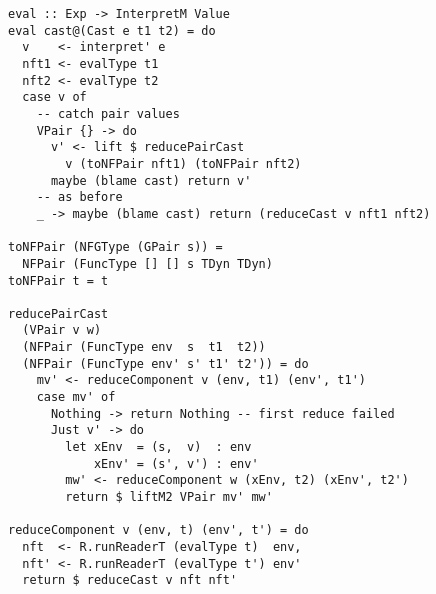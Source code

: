 \begin{lstlisting}[float,
  caption=Rule \textsc{Cast-Pair} (\texttt{Interpreter.hs}),
  label=lst:pair-cast]
eval :: Exp -> InterpretM Value
eval cast@(Cast e t1 t2) = do
  v    <- interpret' e
  nft1 <- evalType t1
  nft2 <- evalType t2
  case v of
    -- catch pair values
    VPair {} -> do
      v' <- lift $ reducePairCast
        v (toNFPair nft1) (toNFPair nft2)
      maybe (blame cast) return v'
    -- as before
    _ -> maybe (blame cast) return (reduceCast v nft1 nft2)

toNFPair (NFGType (GPair s)) =
  NFPair (FuncType [] [] s TDyn TDyn)
toNFPair t = t

reducePairCast
  (VPair v w)
  (NFPair (FuncType env  s  t1  t2))
  (NFPair (FuncType env' s' t1' t2')) = do
    mv' <- reduceComponent v (env, t1) (env', t1')
    case mv' of
      Nothing -> return Nothing -- first reduce failed
      Just v' -> do
        let xEnv  = (s,  v)  : env
            xEnv' = (s', v') : env'
        mw' <- reduceComponent w (xEnv, t2) (xEnv', t2')
        return $ liftM2 VPair mv' mw'

reduceComponent v (env, t) (env', t') = do
  nft  <- R.runReaderT (evalType t)  env,
  nft' <- R.runReaderT (evalType t') env'
  return $ reduceCast v nft nft'
\end{lstlisting}
